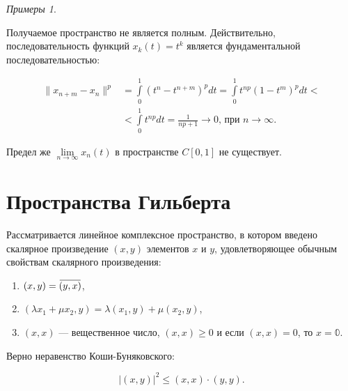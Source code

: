 \documentclass[12pt,a4paper,titlepage,oneside]{book}
\newcommand{\overbar}[1]{\mkern 1.5mu\overline{\mkern-1.5mu#1\mkern-1.5mu}\mkern 1.5mu}
\theoremstyle{definition}
\theoremstyle{plain}
\theoremstyle{break}
\theoremstyle{remark}
\theoremstyle{remark}
\theoremstyle{remark}
\newtheorem*{examples}{Примеры}
\theoremstyle{remark}
\theoremstyle{plain}
\theoremstyle{plain}
\begin{document}
\begin{examples}
\begin{enumerate}
	Получаемое пространство не является полным. Действительно, последовательность функций $x_k(t)=t^k$ является фундаментальной последовательностью:

	\begin{align*}
	\lVert x_{n+m}-x_n\rVert^p &= \int\limits_0^1(t^n-t^{n+m})^pdt = \int\limits_0^1t^{np}(1-t^m)^pdt <\\
	&< \int\limits_0^1t^{np}dt = \frac{1}{np+1}\to0 \mbox{, при } n \to\infty.
	\end{align*}

	Предел же $\lim \limits_{n \to \infty} x_n(t)$ в пространстве $C[0,1]$ не существует.

\end{enumerate}

\end{examples}

\section{Пространства Гильберта}

Рассматривается линейное комплексное пространство, в котором введено скалярное произведение $(x, y)$ элементов $x$ и $y$, удовлетворяющее обычным свойствам скалярного произведения:

\begin{enumerate}

    \item $(x, y) = \overbar{(y, x)}$,

    \item $(\lambda x_1 + \mu x_2, y) = \lambda (x_1, y) + \mu (x_2, y)$,

    \item $(x, x)$ --- вещественное число, $(x, x) \geqslant 0$ и если $(x, x) = 0$, то $x = \mathbb{0}$.

\end{enumerate}

Верно неравенство Коши-Буняковского:

\begin{equation*}
\big\lvert (x, y) \big\rvert ^2 \leqslant (x, x) \cdot (y, y).
\end{equation*}
\end{document}
